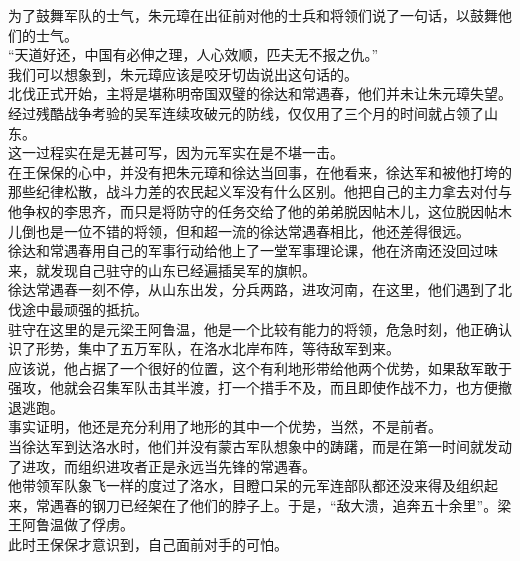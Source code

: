 \begin{multicols}{\theparacolNo}
为了鼓舞军队的士气，朱元璋在出征前对他的士兵和将领们说了一句话，以鼓舞他们的士气。\\

“天道好还，中国有必伸之理，人心效顺，匹夫无不报之仇。”\\

我们可以想象到，朱元璋应该是咬牙切齿说出这句话的。\\

北伐正式开始，主将是堪称明帝国双璧的徐达和常遇春，他们并未让朱元璋失望。经过残酷战争考验的吴军连续攻破元的防线，仅仅用了三个月的时间就占领了山东。\\

这一过程实在是无甚可写，因为元军实在是不堪一击。\\

在王保保的心中，并没有把朱元璋和徐达当回事，在他看来，徐达军和被他打垮的那些纪律松散，战斗力差的农民起义军没有什么区别。他把自己的主力拿去对付与他争权的李思齐，而只是将防守的任务交给了他的弟弟脱因帖木儿，这位脱因帖木儿倒也是一位不错的将领，但和超一流的徐达常遇春相比，他还差得很远。\\

徐达和常遇春用自己的军事行动给他上了一堂军事理论课，他在济南还没回过味来，就发现自己驻守的山东已经遍插吴军的旗帜。\\

徐达常遇春一刻不停，从山东出发，分兵两路，进攻河南，在这里，他们遇到了北伐途中最顽强的抵抗。\\

驻守在这里的是元梁王阿鲁温，他是一个比较有能力的将领，危急时刻，他正确认识了形势，集中了五万军队，在洛水北岸布阵，等待敌军到来。\\

应该说，他占据了一个很好的位置，这个有利地形带给他两个优势，如果敌军敢于强攻，他就会召集军队击其半渡，打一个措手不及，而且即使作战不力，也方便撤退逃跑。\\

事实证明，他还是充分利用了地形的其中一个优势，当然，不是前者。\\

当徐达军到达洛水时，他们并没有蒙古军队想象中的踌躇，而是在第一时间就发动了进攻，而组织进攻者正是永远当先锋的常遇春。\\

他带领军队象飞一样的度过了洛水，目瞪口呆的元军连部队都还没来得及组织起来，常遇春的钢刀已经架在了他们的脖子上。于是，“敌大溃，追奔五十余里”。梁王阿鲁温做了俘虏。\\

此时王保保才意识到，自己面前对手的可怕。\\


\end{multicols}
